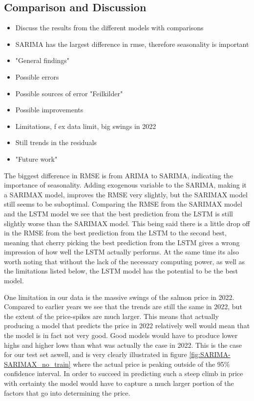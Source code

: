 \subsection{Comparison and Discussion}\label{sec:comparison}

\begin{itemize}
    \item Discuss the results from the different models with comparisons
    \item SARIMA has the largest difference in rmse, therefore seasonality is important
    \item "General findings"
    \item Possible errors
    \item Possible sources of error "Feilkilder"
    \item Possible improvements
    \item Limitations, f ex data limit, big swings in 2022
    \item Still trends in the residuals
    \item "Future work"
\end{itemize}

The biggest difference in RMSE is from ARIMA to SARIMA, indicating the importance of seasonality. Adding exogenous variable to the SARIMA, making it a SARIMAX model, improves the RMSE very slightly, but the SARIMAX model still seems to be suboptimal. Comparing the RMSE from the SARIMAX model and the LSTM model we see that the best prediction from the LSTM is still slightly worse than the SARIMAX model. This being said there is a little drop off in the RMSE from the best prediction from the LSTM to the second best, meaning that cherry picking the best prediction from the LSTM gives a wrong impression of how well the LSTM actually performs. At the same time its also worth noting that without the lack of the necessary computing power, as well as the limitations listed below, the LSTM model has the potential to be the best model.

One limitation in our data is the massive swings of the salmon price in 2022. Compared to earlier years we see that the trends are still the same in 2022, but the extent of the price-spikes are much larger. This means that actually producing a model that predicts the price in 2022 relatively well would mean that the model is in fact not very good. Good models would have to produce lower highs and higher lows than what was actually the case in 2022. This is the case for our test set aswell, and is very clearly illustrated in figure \ref{fig:SARIMA-SARIMAX_no_train} where the actual price is peaking outside of the 95\% confidence interval. In order to succeed in predicting such a steep climb in price with certainty the model would have to capture a much larger portion of the factors that go into determining the price.

